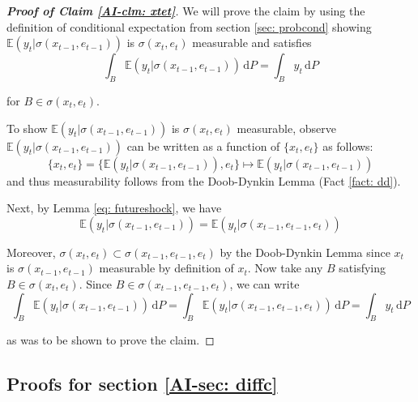 \documentclass[12pt]{ectaart}
\newcommand{\1}{\mathbbm 1}
\theoremstyle{plain}
\theoremstyle{definition}
\begin{document}
  
	\begin{proof}[\textbf{Proof of Claim \ref{AI-clm: xtet}}]
	
	We will prove the claim by using the definition of conditional expectation from section \ref{sec: probcond} showing $\mathbb{E}(y_{t}\vert \sigma(x_{t-1}, e_{t-1}))$ is $\sigma(x_{t},e_{t})$ measurable and satisfies 
	\begin{equation*}
	\int_{B} \mathbb{E}(y_{t}\vert \sigma(x_{t-1}, e_{t-1}))\,\mathrm{d}P = \int_{B}y_{t}\,\mathrm{d}P 
	\end{equation*}
	
	for $B\in \sigma(x_{t},e_{t})$.
	
	To show $\mathbb{E}(y_{t}\vert \sigma(x_{t-1},e_{t-1}))$ is $\sigma(x_{t},e_{t})$ measurable, observe $\mathbb{E}(y_{t}\vert \sigma(x_{t-1},e_{t-1}))$ can be written as a function of $\{x_{t},e_{t}\}$ as follows:
	\begin{equation*}
	\{x_{t},e_{t}\} =  \{\mathbb{E}(y_{t}\vert \sigma(x_{t-1},e_{t-1})),e_{t}\} \mapsto \mathbb{E}(y_{t}\vert \sigma(x_{t-1},e_{t-1}))
	\end{equation*}
	and thus measurability follows from the Doob-Dynkin Lemma (Fact \ref{fact: dd}).
	
	Next, by Lemma \ref{eq: futureshock}, we have
	\begin{equation*}
	\mathbb{E}(y_{t}\vert \sigma(x_{t-1}, e_{t-1})) = \mathbb{E}(y_{t}\vert \sigma(x_{t-1}, e_{t-1}, e_{t}))
	\end{equation*}
	
	Moreover, $\sigma(x_{t}, e_{t})\subset \sigma(x_{t-1}, e_{t-1}, e_{t})$ by the Doob-Dynkin Lemma since $x_{t}$ is $\sigma(x_{t-1}, e_{t-1})$ measurable by definition of $x_{t}$. Now take any $B$ satisfying $B\in \sigma(x_{t}, e_{t})$. Since $B\in \sigma(x_{t-1}, e_{t-1}, e_{t})$, we can write  
	\begin{equation*}
	\int_{B} \mathbb{E}(y_{t}\vert \sigma(x_{t-1}, e_{t-1}))\,\mathrm{d}P = \int_{B} \mathbb{E}(y_{t}\vert \sigma(x_{t-1}, e_{t-1}, e_{t}))\,\mathrm{d}P = \int_{B}y_{t}\,\mathrm{d}P 
	\end{equation*}
	
	as was to be shown to prove the claim. 
	
	\end{proof}

	\subsection*{Proofs for section \ref{AI-sec: diffc}}
	
\end{document}
